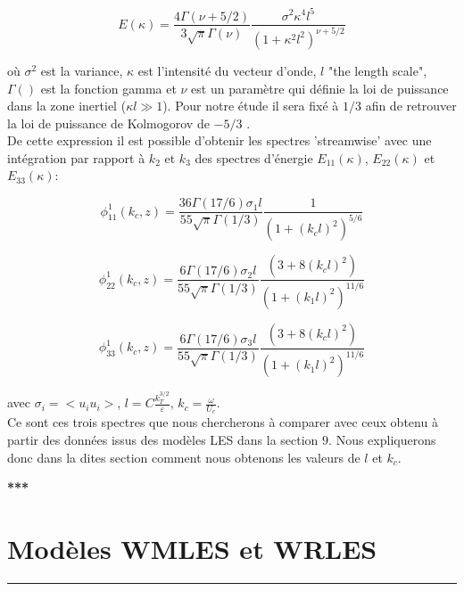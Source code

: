 \documentclass[12pt]{article}
\theoremstyle{plain}
\theoremstyle{remark}
\begin{document}
	\begin{equation}
		E(\kappa) = \frac{4\Gamma(\nu + 5/2)}{3\sqrt{\pi}\Gamma(\nu)}\frac{\sigma^2\kappa^4l^5}{(1+\kappa^2l^2)^{\nu + 5/2}}
		\label{energie_spectra}
	\end{equation}

	où $\sigma^2$ est la variance, $\kappa$ est l'intensité du vecteur d'onde, $l$ "the length scale", $\Gamma()$ est la fonction gamma et $\nu$ est un paramètre qui définie la loi de puissance dans la zone inertiel ($\kappa l \gg 1$). Pour notre étude il sera fixé à $1/3$ afin de retrouver la loi de puissance de Kolmogorov de $-5/3$ \cite{kolmogorov1991local}. \\

	De cette expression il est possible d'obtenir les spectres 'streamwise' avec une intégration par rapport à $k_2$ et $k_3$ des spectres d'énergie $E_{11}(\kappa)$, $E_{22}(\kappa)$ et $E_{33}(\kappa)$:
	
	\begin{equation}
		\phi_{11}^1(k_c,z) = \frac{36\Gamma(17/6)\sigma_1l}{55\sqrt{\pi}\Gamma(1/3)}\frac{1}{(1 + (k_cl)^2)^{5/6}}
		\label{eq:phi_vk_1}
	\end{equation}

	\begin{equation}
		\phi_{22}^1(k_c,z) = \frac{6\Gamma(17/6)\sigma_2l}{55\sqrt{\pi}\Gamma(1/3)}\frac{(3+8(k_cl)^2)}{(1 + (k_1l)^2)^{11/6}}
		\label{eq:phi_vk_2}
	\end{equation}

	\begin{equation}
		\phi_{33}^1(k_c,z) = \frac{6\Gamma(17/6)\sigma_3l}{55\sqrt{\pi}\Gamma(1/3)}\frac{(3+8(k_cl)^2)}{(1 + (k_1l)^2)^{11/6}}
		\label{eq:phi_vk_3}
	\end{equation}

	avec $\sigma_i = <u_iu_i>$, $l=C\frac{k_T^{3/2}}{\varepsilon}$, $k_c = \frac{\omega}{U_c}$.\\
	
	Ce sont ces trois spectres que nous chercherons à comparer avec ceux obtenu à partir des données issus des modèles LES dans la section $9$. Nous expliquerons donc dans la dites section comment nous obtenons les valeurs de $l$ et $k_c$.
	
	
		 
\begin{center}
	\large \bf{***}
\end{center}

\vspace{0.3cm}	
\section{Modèles WMLES et WRLES}
\noindent\rule{\linewidth}{2pt}
\vspace{0.1cm}
\end{document}
